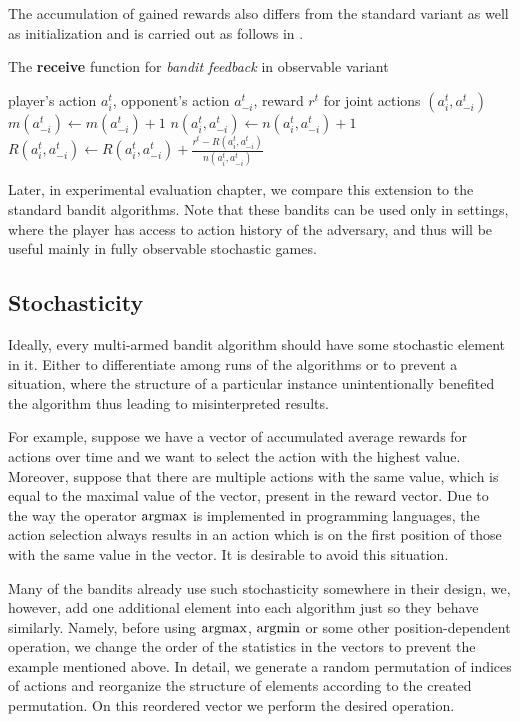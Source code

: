 \documentclass[../main.tex]{subfiles}
\begin{document}
The accumulation of gained rewards also differs from the standard variant as well as initialization and is carried out as follows in .
\begin{algorithm}[ht]
    \caption{The \textbf{receive} function for \textit{bandit feedback} in observable variant}
    \label{new:bandit:obs:receive}
    \begin{algorithmic}[1]
        \Require player's action $a_i^t$, opponent's action $a_{-i}^t$, reward $r^t$ for joint actions $\left(a_i^t, a_{-i}^t\right)$
        \State $m(a_{-i}^t) \leftarrow m(a_{-i}^t) + 1$
        \State $n(a_i^t, a_{-i}^t) \leftarrow n(a_i^t, a_{-i}^t) + 1$
        \State $R(a_i^t, a_{-i}^t) \leftarrow R(a_i^t, a_{-i}^t) + \frac{r^t - R(a_i^t, a_{-i}^t)}{n(a_i^t, a_{-i}^t)}$
    \end{algorithmic}
\end{algorithm}
Later, in experimental evaluation chapter, we compare this extension to the standard bandit algorithms.
Note that these bandits can be used only in settings, where the player has access to action history of the adversary, and thus will be useful mainly in fully observable stochastic games.

\subsection{Stochasticity}\label{new:bandit:stochasticity}
Ideally, every multi-armed bandit algorithm should have some stochastic element in it.
Either to differentiate among runs of the algorithms or to prevent a situation, where the structure of a particular instance unintentionally benefited the algorithm thus leading to misinterpreted results.

For example, suppose we have a vector of accumulated average rewards for actions over time and we want to select the action with the highest value.
Moreover, suppose that there are multiple actions with the same value, which is equal to the maximal value of the vector, present in the reward vector.
Due to the way the operator $\operatorname*{argmax}$ is implemented in programming languages, the action selection always results in an action which is on the first position of those with the same value in the vector.
It is desirable to avoid this situation.

Many of the bandits already use such stochasticity somewhere in their design, we, however, add one additional element into each algorithm just so they behave similarly.
Namely, before using $\operatorname*{argmax}$, $\operatorname*{argmin}$ or some other position-dependent operation, we change the order of the statistics in the vectors to prevent the example mentioned above.
In detail, we generate a random permutation of indices of actions and reorganize the structure of elements according to the created permutation.
On this reordered vector we perform the desired operation.
\end{document}
